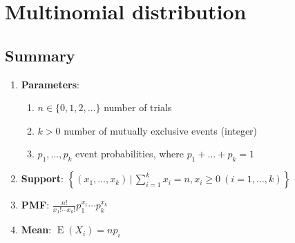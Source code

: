 \section{Multinomial distribution}






\subsection{Summary}

\begin{enumerate}

    \item \textbf{Parameters}:
    \begin{enumerate}
        \item ${\displaystyle n\in \{0,1,2,\ldots \}}$ number of trials
        \hfill \cite{wiki/Multinomial_distribution}
        
        \item ${\displaystyle k>0}$ number of mutually exclusive events (integer)
        \hfill \cite{wiki/Multinomial_distribution}
        
        \item ${\displaystyle p_{1},\ldots ,p_{k}}$ event probabilities, where ${\displaystyle p_{1}+\dots +p_{k}=1}$
        \hfill \cite{wiki/Multinomial_distribution}
    \end{enumerate}
    \hfill \cite{wiki/Multinomial_distribution}

    \item \textbf{Support}:
    $  {\displaystyle \left\lbrace (x_{1},\dots ,x_{k})\,{\Big \vert }\,\sum _{i=1}^{k}x_{i}=n,x_{i}\geq 0\ (i=1,\dots ,k)\right\rbrace } $ 
    \hfill \cite{wiki/Multinomial_distribution}

    \item \textbf{PMF}:
    $  {\displaystyle {\frac {n!}{x_{1}!\cdots x_{k}!}}p_{1}^{x_{1}}\cdots p_{k}^{x_{k}}} $
    \hfill \cite{wiki/Multinomial_distribution}


    \item \textbf{Mean}:
    $  {\displaystyle \operatorname {E} (X_{i})=np_{i}} $
    \hfill \cite{wiki/Multinomial_distribution}


\end{enumerate}
